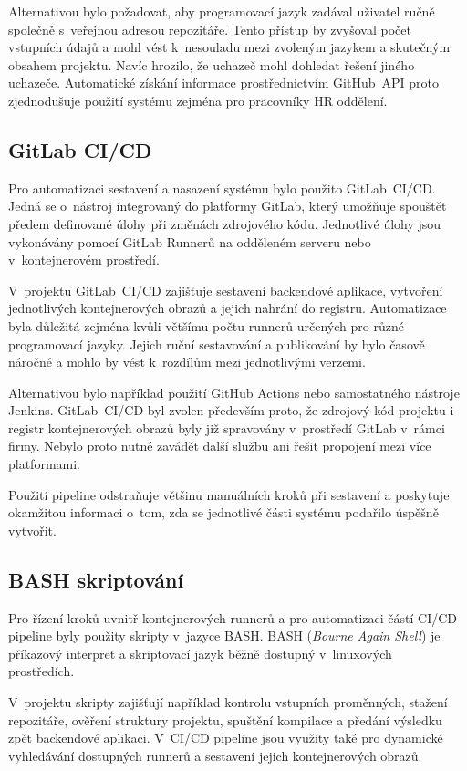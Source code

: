 \documentclass[
  biblatex,
  figures,
  tables,
  glossaries,
  index
]{kidiplom}
\begin{document}
Alternativou bylo požadovat, aby programovací jazyk zadával uživatel ručně společně s~veřejnou adresou repozitáře. Tento přístup by zvyšoval počet vstupních údajů a mohl vést k~nesouladu mezi zvoleným jazykem a skutečným obsahem projektu. Navíc hrozilo, že uchazeč mohl dohledat řešení jiného uchazeče. Automatické získání informace prostřednictvím GitHub~API proto zjednodušuje použití systému zejména pro pracovníky HR oddělení.


\subsection{GitLab CI/CD}
Pro automatizaci sestavení a nasazení systému bylo použito GitLab~CI/CD. Jedná se o~nástroj integrovaný do platformy GitLab, který umožňuje spouštět předem definované úlohy při změnách zdrojového kódu. Jednotlivé úlohy jsou vykonávány pomocí GitLab Runnerů na odděleném serveru nebo v~kontejnerovém prostředí.

V~projektu GitLab~CI/CD zajišťuje sestavení backendové aplikace, vytvoření jednotlivých kontejnerových obrazů a jejich nahrání do registru. Automatizace byla důležitá zejména kvůli většímu počtu runnerů určených pro různé programovací jazyky. Jejich ruční sestavování a publikování by bylo časově náročné a mohlo by vést k~rozdílům mezi jednotlivými verzemi.~\cite{gitlabcicd}

Alternativou bylo například použití GitHub Actions nebo samostatného nástroje Jenkins. GitLab~CI/CD byl zvolen především proto, že zdrojový kód projektu i registr kontejnerových obrazů byly již spravovány v~prostředí GitLab v~rámci firmy. Nebylo proto nutné zavádět další službu ani řešit propojení mezi více platformami.

Použití pipeline odstraňuje většinu manuálních kroků při sestavení a poskytuje okamžitou informaci o~tom, zda se jednotlivé části systému podařilo úspěšně vytvořit.


\subsection{BASH skriptování}
Pro řízení kroků uvnitř kontejnerových runnerů a pro automatizaci částí CI/CD pipeline byly použity skripty v~jazyce BASH. BASH (\textit{Bourne Again Shell}) je příkazový interpret a skriptovací jazyk běžně dostupný v~linuxových prostředích.~\cite{bash}

V~projektu skripty zajišťují například kontrolu vstupních proměnných, stažení repozitáře, ověření struktury projektu, spuštění kompilace a předání výsledku zpět backendové aplikaci. V~CI/CD pipeline jsou využity také pro dynamické vyhledávání dostupných runnerů a sestavení jejich kontejnerových obrazů.
\end{document}
